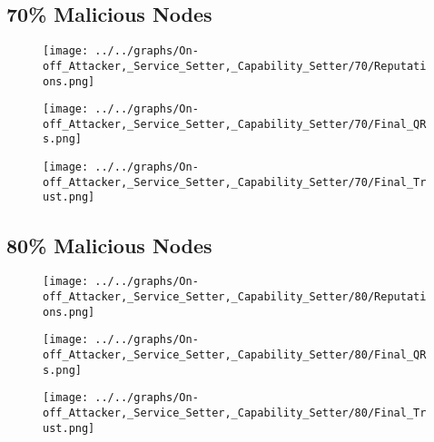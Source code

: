 \begin{minipage}[t]{0.49\columnwidth}
\subsection*{70\% Malicious Nodes}
    \begin{figure}[H]
        \centering
        \texttt{[image: ../../graphs/On-off\_Attacker,\_Service\_Setter,\_Capability\_Setter/70/Reputations.png]}
    \end{figure}
    \begin{figure}[H]
        \centering
        \texttt{[image: ../../graphs/On-off\_Attacker,\_Service\_Setter,\_Capability\_Setter/70/Final\_QRs.png]}
    \end{figure}
\end{minipage}
\begin{minipage}[t]{0.49\columnwidth}
    \begin{figure}[H]
        \centering
        \texttt{[image: ../../graphs/On-off\_Attacker,\_Service\_Setter,\_Capability\_Setter/70/Final\_Trust.png]}
    \end{figure}
\end{minipage}

\begin{minipage}[t]{0.49\columnwidth}
\subsection*{80\% Malicious Nodes}
    \begin{figure}[H]
        \centering
        \texttt{[image: ../../graphs/On-off\_Attacker,\_Service\_Setter,\_Capability\_Setter/80/Reputations.png]}
    \end{figure}
    \begin{figure}[H]
        \centering
        \texttt{[image: ../../graphs/On-off\_Attacker,\_Service\_Setter,\_Capability\_Setter/80/Final\_QRs.png]}
    \end{figure}
\end{minipage}
\begin{minipage}[t]{0.49\columnwidth}
    \begin{figure}[H]
        \centering
        \texttt{[image: ../../graphs/On-off\_Attacker,\_Service\_Setter,\_Capability\_Setter/80/Final\_Trust.png]}
    \end{figure}
\end{minipage}

